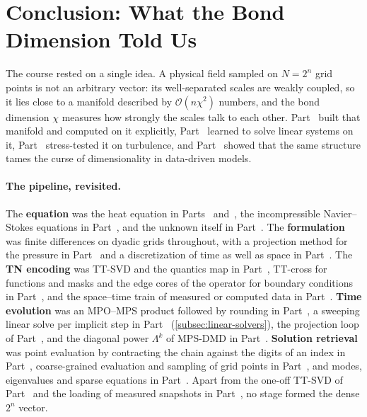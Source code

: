 \section{Conclusion: What the Bond Dimension Told Us}
\label{sec:conclusion}


The course rested on a single idea. A physical field sampled on $N = 2^n$ grid
points is not an arbitrary vector: its well-separated scales are weakly coupled,
so it lies close to a manifold described by $\mathcal O(n\chi^2)$ numbers, and
the bond dimension $\chi$ measures how strongly the scales talk to each other.
Part~ built that manifold and computed on it explicitly,
Part~ learned to solve linear systems on it, Part~
stress-tested it on turbulence, and Part~ showed that the same
structure tames the curse of dimensionality in data-driven models.

\paragraph{The pipeline, revisited.}
The \textbf{equation} was the heat equation in Parts~
and~, the incompressible Navier--Stokes equations in
Part~, and the unknown itself in Part~. The
\textbf{formulation} was finite differences on dyadic grids throughout, with a
projection method for the pressure in Part~ and a discretization of
time as well as space in Part~. The \textbf{TN encoding} was TT-SVD
and the quantics map in Part~, TT-cross for functions and masks
and the edge cores of the operator for boundary conditions in
Part~, and the space--time train of measured
or computed data in Part~. \textbf{Time evolution} was an MPO--MPS
product followed by rounding in Part~, a sweeping linear solve per
implicit step in Part~ (\cref{subsec:linear-solvers}), the projection
loop of Part~, and the diagonal power $\Lambda^k$ of MPS-DMD in
Part~. \textbf{Solution retrieval} was point evaluation by
contracting the chain against the digits of an index in Part~,
coarse-grained evaluation and sampling of grid points in Part~, and modes,
eigenvalues and sparse equations in Part~. Apart from the one-off
TT-SVD of Part~ and the loading of measured snapshots in
Part~, no stage formed the dense $2^n$ vector.

